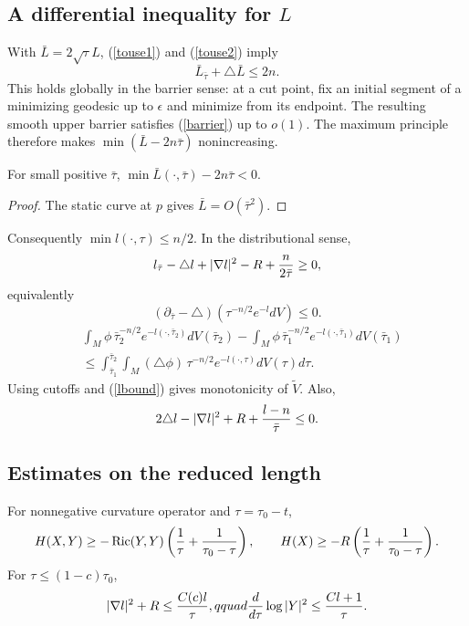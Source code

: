 \subsection{A differential inequality for $L$} \label{I.(7.15)}
With $\bar L=2\sqrt\tau L$, (\ref{touse1}) and (\ref{touse2}) imply
\begin{equation}\label{barrier}\bar L_{\bar\tau}+\triangle\bar L\le2n.
\end{equation}
This holds globally in the barrier sense: at a cut point, fix an initial segment
of a minimizing geodesic up to $\epsilon$ and minimize from its endpoint. The resulting
smooth upper barrier satisfies (\ref{barrier}) up to $o(1)$. The maximum principle
therefore makes $\min(\bar L-2n\bar\tau)$ nonincreasing.
\begin{lemma}
  \label{lem:kl-reduced-l-geometry-positivity-reduced-l-geometry}
  \label{neg}
For small positive $\bar\tau$, $\min\bar L(\cdot,\bar\tau)-2n\bar\tau<0$.
\end{lemma}
\begin{proof}
\sketch
The static curve at $p$ gives $\bar L=O(\bar\tau^2)$.
\end{proof}
Consequently $\min l(\cdot,\tau)\le n/2$. In the distributional sense,
\begin{equation}
l_{\bar\tau}-\triangle l+|\nabla l|^2-R+{n\over2\bar\tau}\ge0,
\end{equation}
equivalently
\begin{equation}\label{illustrate}(\partial_{\bar\tau}-\triangle)(\tau^{-n/2}e^{-l}dV)\le0.
\end{equation}
\begin{align}\label{pphieqn}
&\int_M\phi\,\bar\tau_2^{-n/2}e^{-l(\cdot,\bar\tau_2)}dV(\bar\tau_2)
-\int_M\phi\,\bar\tau_1^{-n/2}e^{-l(\cdot,\bar\tau_1)}dV(\bar\tau_1)\\
&\le\int_{\bar\tau_1}^{\bar\tau_2}\int_M(\triangle\phi)\,
\tau^{-n/2}e^{-l(\cdot,\tau)}dV(\tau)d\tau.
\end{align}
Using cutoffs and (\ref{lbound}) gives monotonicity of $\tilde V$. Also,
\begin{equation}\label{illustrate2}2\triangle l-|\nabla l|^2+R+{l-n\over\bar\tau}\le0.\end{equation}

\subsection{Estimates on the reduced length}
For nonnegative curvature operator and $\tau=\tau_0-t$,
\begin{equation}\label{ineqtoshow}H(X,Y)\ge-\operatorname{Ric}(Y,Y)\left({1\over\tau}+{1\over\tau_0-\tau}\right),\qquad
H(X)\ge-R\left({1\over\tau}+{1\over\tau_0-\tau}\right).
\end{equation}
For $\tau\le(1-c)\tau_0$,
\begin{equation}\label{I.(7.16)}|\nabla l|^2+R\le {C(c)l\over\tau},qquad
{d\over d\tau}\log|Y|^2\le {Cl+1\over\tau}.
\end{equation}

